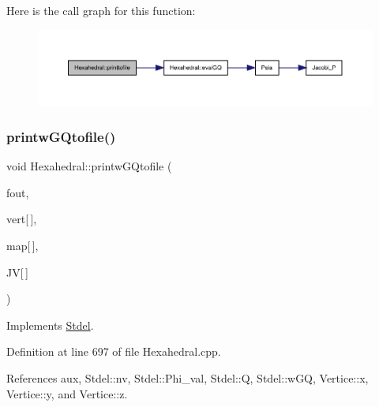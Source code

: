 Here is the call graph for this function\+:
\nopagebreak
\begin{figure}[H]
\begin{center}
\leavevmode
\includegraphics[width=350pt]{classHexahedral_a50af1e899b7b2642cbe7a2291e949ad3_cgraph}
\end{center}
\end{figure}
\mbox{\label{classHexahedral_a49c5ff368a7d79790d94eef711cb8537}} 
\subsubsection{\texorpdfstring{printw\+G\+Qtofile()}{printwGQtofile()}}
{\footnotesize\ttfamily void Hexahedral\+::printw\+G\+Qtofile (\begin{DoxyParamCaption}\item[{F\+I\+LE $\ast$}]{fout,  }\item[{const \hyperlink{structVertice}{Vertice}}]{vert\mbox{[}$\,$\mbox{]},  }\item[{const int}]{map\mbox{[}$\,$\mbox{]},  }\item[{const double}]{JV\mbox{[}$\,$\mbox{]} }\end{DoxyParamCaption})\hspace{0.3cm}{\ttfamily [virtual]}}



Implements \hyperlink{classStdel_aec7751f7873772d930c91cf93ec6b07b}{Stdel}.



Definition at line 697 of file Hexahedral.\+cpp.



References aux, Stdel\+::nv, Stdel\+::\+Phi\+\_\+val, Stdel\+::Q, Stdel\+::w\+GQ, Vertice\+::x, Vertice\+::y, and Vertice\+::z.

\mbox{\label{classStdel_aeea4659f5bcabbf1acb374180c43a293}} 
